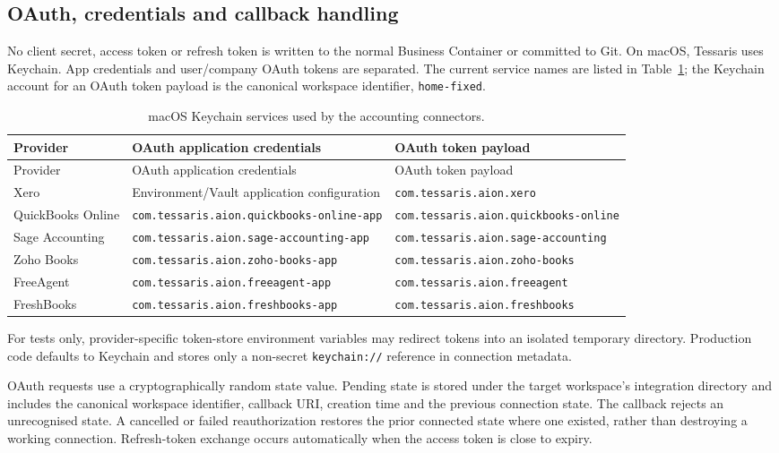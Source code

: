 \subsection{OAuth, credentials and callback handling}

No client secret, access token or refresh token is written to the normal
Business Container or committed to Git.  On macOS, Tessaris uses Keychain.  App
credentials and user/company OAuth tokens are separated.  The current service
names are listed in Table~\ref{tab:accounting-keychain-services}; the Keychain
account for an OAuth token payload is the canonical workspace identifier,
\texttt{home-fixed}.

\begin{longtable}{@{}p{}p{}p{}@{}}
\caption{macOS Keychain services used by the accounting connectors.}
\label{tab:accounting-keychain-services}\\
\toprule
Provider & OAuth application credentials & OAuth token payload \\
\midrule
\endfirsthead
\toprule
Provider & OAuth application credentials & OAuth token payload \\
\midrule
\endhead
Xero & Environment/Vault application configuration & \texttt{com.tessaris.aion.xero} \\
QuickBooks Online & \texttt{com.tessaris.aion.quickbooks-online-app} & \texttt{com.tessaris.aion.quickbooks-online} \\
Sage Accounting & \texttt{com.tessaris.aion.sage-accounting-app} & \texttt{com.tessaris.aion.sage-accounting} \\
Zoho Books & \texttt{com.tessaris.aion.zoho-books-app} & \texttt{com.tessaris.aion.zoho-books} \\
FreeAgent & \texttt{com.tessaris.aion.freeagent-app} & \texttt{com.tessaris.aion.freeagent} \\
FreshBooks & \texttt{com.tessaris.aion.freshbooks-app} & \texttt{com.tessaris.aion.freshbooks} \\
\bottomrule
\end{longtable}

For tests only, provider-specific token-store environment variables may redirect
tokens into an isolated temporary directory.  Production code defaults to
Keychain and stores only a non-secret \texttt{keychain://} reference in
connection metadata.

OAuth requests use a cryptographically random state value.  Pending state is
stored under the target workspace's integration directory and includes the
canonical workspace identifier, callback URI, creation time and the previous
connection state.  The callback rejects an unrecognised state.  A cancelled or
failed reauthorization restores the prior connected state where one existed,
rather than destroying a working connection.  Refresh-token exchange occurs
automatically when the access token is close to expiry.

